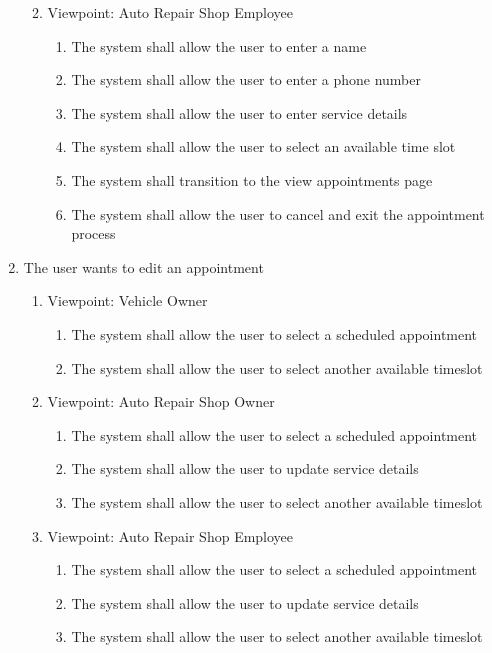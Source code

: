 \documentclass[12pt]{article}
\begin{document}
\begin{enumerate}[resume*=business_events]
\begin{enumerate}[VP\arabic*.]
\begin{enumerate}
		            \end{enumerate}
		      \item Viewpoint: Auto Repair Shop Employee
		            \begin{enumerate}
			            \item The system shall allow the user to enter a name
			            \item The system shall allow the user to enter a phone number
			            \item The system shall allow the user to enter service details
			            \item The system shall allow the user to select an available time slot
			            \item The system shall transition to the view appointments page
			            \item The system shall allow the user to cancel and exit the appointment process
		            \end{enumerate}
	      \end{enumerate}

	\item The user wants to edit an appointment
	      \begin{enumerate}[VP\arabic*.]
		      \item Viewpoint: Vehicle Owner
		            \begin{enumerate}
			            \item The system shall allow the user to select a scheduled appointment
			            \item The system shall allow the user to select another available timeslot
		            \end{enumerate}
		      \item Viewpoint: Auto Repair Shop Owner
		            \begin{enumerate}
			            \item The system shall allow the user to select a scheduled appointment
			            \item The system shall allow the user to update service details
			            \item The system shall allow the user to select another available timeslot
		            \end{enumerate}
		      \item Viewpoint: Auto Repair Shop Employee
		            \begin{enumerate}
			            \item The system shall allow the user to select a scheduled appointment
			            \item The system shall allow the user to update service details
			            \item The system shall allow the user to select another available timeslot
		            \end{enumerate}
	      \end{enumerate}


\end{enumerate}
\end{document}
